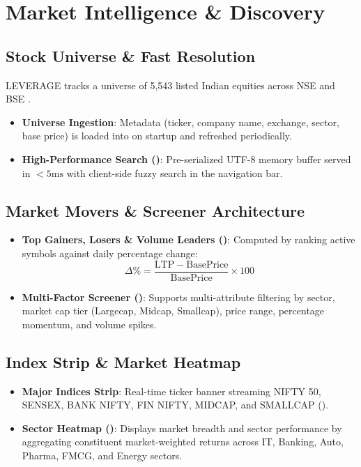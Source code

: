 \chapter{Market Intelligence \& Discovery}
\label{ch:market_intelligence}

\section{Stock Universe \& Fast Resolution}
LEVERAGE tracks a universe of 5,543 listed Indian equities across NSE and BSE \cite{ref:main_py}.
\begin{itemize}[leftmargin=6mm,itemsep=1.5mm]
    \item \textbf{Universe Ingestion}: Metadata (ticker, company name, exchange, sector, base price) is loaded into  on startup and refreshed periodically.
    \item \textbf{High-Performance Search ()}: Pre-serialized UTF-8 memory buffer served in $<5\text{ms}$ with client-side fuzzy search in the navigation bar.
\end{itemize}

\section{Market Movers \& Screener Architecture}
\begin{itemize}[leftmargin=6mm,itemsep=1.5mm]
    \item \textbf{Top Gainers, Losers \& Volume Leaders ()}:
    Computed by ranking active symbols against daily percentage change:
    \begin{equation}
        \Delta\% = \frac{\mathrm{LTP} - \mathrm{BasePrice}}{\mathrm{BasePrice}} \times 100
    \end{equation}
    \item \textbf{Multi-Factor Screener ()}:
    Supports multi-attribute filtering by sector, market cap tier (Largecap, Midcap, Smallcap), price range, percentage momentum, and volume spikes.
\end{itemize}

\section{Index Strip \& Market Heatmap}
\begin{itemize}[leftmargin=6mm,itemsep=1.5mm]
    \item \textbf{Major Indices Strip}: Real-time ticker banner streaming NIFTY 50, SENSEX, BANK NIFTY, FIN NIFTY, MIDCAP, and SMALLCAP ().
    \item \textbf{Sector Heatmap ()}: Displays market breadth and sector performance by aggregating constituent market-weighted returns across IT, Banking, Auto, Pharma, FMCG, and Energy sectors.
\end{itemize}
